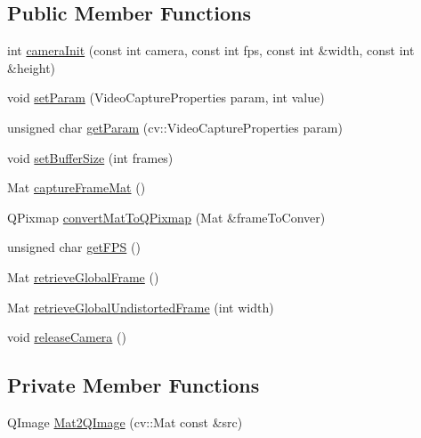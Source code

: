 \subsection*{Public Member Functions}
\begin{DoxyCompactItemize}
\item 
int \mbox{\hyperlink{classCamera_a6d17b81a1e987db60f5144d922f54e9d}{camera\+Init}} (const int camera, const int fps, const int \&width, const int \&height)
\item 
void \mbox{\hyperlink{classCamera_a9c9ba5d6bed27bdd033ea40280741cf9}{set\+Param}} (Video\+Capture\+Properties param, int value)
\item 
unsigned char \mbox{\hyperlink{classCamera_ab906269480057a5634f0760b3598e71f}{get\+Param}} (cv\+::\+Video\+Capture\+Properties param)
\item 
void \mbox{\hyperlink{classCamera_a74895f8b2414f9d5cc84682b096e0d66}{set\+Buffer\+Size}} (int frames)
\item 
Mat \mbox{\hyperlink{classCamera_abfa965e4380023e2295edd9a13f4ee63}{capture\+Frame\+Mat}} ()
\item 
Q\+Pixmap \mbox{\hyperlink{classCamera_a4d72f8dcccdb1c6bc8a4c1f36ab1553a}{convert\+Mat\+To\+Q\+Pixmap}} (Mat \&frame\+To\+Conver)
\item 
unsigned char \mbox{\hyperlink{classCamera_a4702bbf7ccf85a5a2dd61fbf6abb7237}{get\+F\+PS}} ()
\item 
Mat \mbox{\hyperlink{classCamera_a588c762e434d64ad0b515576436603cf}{retrieve\+Global\+Frame}} ()
\item 
Mat \mbox{\hyperlink{classCamera_a9b9c3210f57f3646f19e31904d5a0544}{retrieve\+Global\+Undistorted\+Frame}} (int width)
\item 
void \mbox{\hyperlink{classCamera_a08ea14c11fdb3be4a43d84db0bd1f9e5}{release\+Camera}} ()
\end{DoxyCompactItemize}
\subsection*{Private Member Functions}
\begin{DoxyCompactItemize}
\item 
Q\+Image \mbox{\hyperlink{classCamera_ae24eefae4557e25d1582f40ead4a36cb}{Mat2\+Q\+Image}} (cv\+::\+Mat const \&src)
\end{DoxyCompactItemize}
